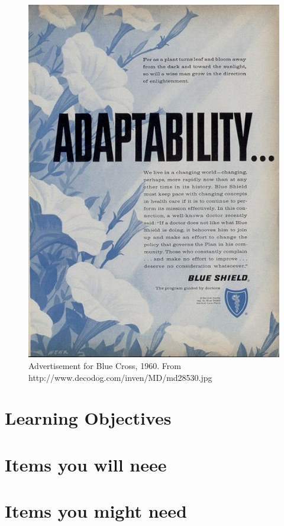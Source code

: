 \begin{figure}[h]
 \centering

 \includegraphics{../images/md28530.jpg}
 \caption{Advertisement for Blue Cross, 1960. From http://www.decodog.com/inven/MD/md28530.jpg }
\label{fig: BlueCross}
\end{figure}


\section{Learning Objectives}
\label{learningobjectives}

\section{Items you will neee}
\label{itemsyouwillneee}

\section{Items you might need}
\label{itemsyoumightneed}

